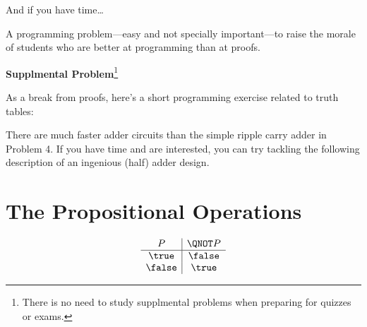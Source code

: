 \documentclass[handout]{mcs}
\begin{document}


\insolutions{\newpage}

\instatements{\newpage}

And if you have time\dots

\begin{staffnotes}
A programming problem---easy and not specially important---to raise
the morale of students who are better at programming than at proofs.
\end{staffnotes}

\begin{center}
\textbf{Supplmental Problem}\footnote{There is no need to study supplmental
  problems when preparing for quizzes or exams.}
\end{center}

As a break from proofs, here's a short programming exercise related to
truth tables:

\medskip

There are much faster adder circuits than the simple ripple carry
adder in Problem 4.  If you have time and are interested, you can try
tackling the following description of an ingenious (half) adder
design.


\iffalse

\instatements{\newpage}
\section*{The Propositional Operations}

\[
\begin{array}{c|c}
P & \QNOT P \\ \hline
\true & \false \\
\false & \true \\
\end{array}
\]
\end{document}
